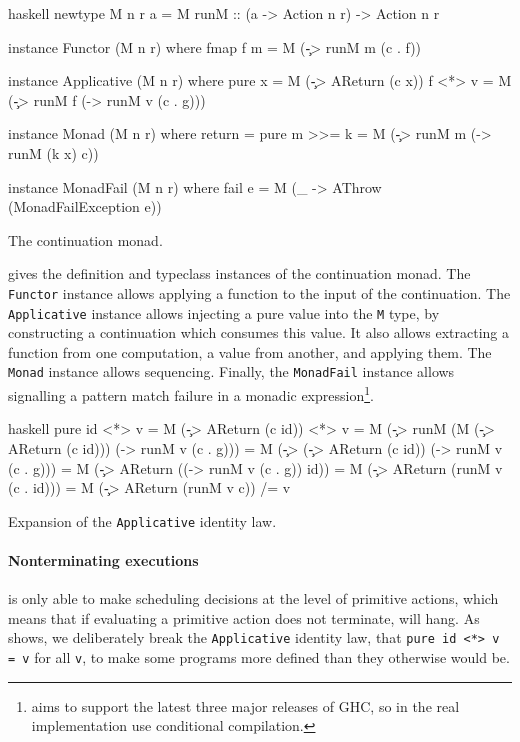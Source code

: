 \FloatBarrier

\begin{listing}
\centering
\begin{cminted}{haskell}
newtype M n r a = M { runM :: (a -> Action n r) -> Action n r }

instance Functor (M n r) where
  fmap f m = M (\c -> runM m (c . f))

instance Applicative (M n r) where
  pure x  = M (\c -> AReturn (c x))
  f <*> v = M (\c -> runM f (\g -> runM v (c . g)))

instance Monad (M n r) where
  return  = pure
  m >>= k = M (\c -> runM m (\x -> runM (k x) c))

instance MonadFail (M n r) where
  fail e = M (\_ -> AThrow (MonadFailException e))
\end{cminted}
\caption{The \dejafu{} continuation monad.}\label{lst:m}
\end{listing}

 gives the definition and typeclass instances of the
\dejafu{} continuation monad.  The \verb|Functor| instance allows
applying a function to the input of the continuation.  The
\verb|Applicative| instance allows injecting a pure value into the
\verb|M| type, by constructing a continuation which consumes this
value.  It also allows extracting a function from one computation, a
value from another, and applying them.  The \verb|Monad| instance
allows sequencing.  Finally, the \verb|MonadFail| instance allows
signalling a pattern match failure in a monadic
expression\footnote{\dejafu{} aims to support the latest three major
  releases of GHC, so in the real implementation use conditional
  compilation.}.

\begin{listing}
\centering
\begin{cminted}{haskell}
pure id <*> v
  = M (\c -> AReturn (c id)) <*> v
  = M (\c -> runM (M (\c -> AReturn (c id))) (\g -> runM v (c . g)))
  = M (\c -> (\c -> AReturn (c id)) (\g -> runM v (c . g)))
  = M (\c -> AReturn ((\g -> runM v (c . g)) id))
  = M (\c -> AReturn (runM v (c . id)))
  = M (\c -> AReturn (runM v c))
 /= v
\end{cminted}
\caption{Expansion of the \texttt{Applicative} identity law.}\label{lst:areturn}
\end{listing}

\paragraph{Nonterminating executions}
\dejafu{} is only able to make scheduling decisions at the level of
primitive actions, which means that if evaluating a primitive action
does not terminate, \dejafu{} will hang.  As  shows,
we deliberately break the \verb|Applicative| identity law, that
\verb|pure id <*> v = v| for all \verb|v|, to make some programs more
defined than they otherwise would be.

